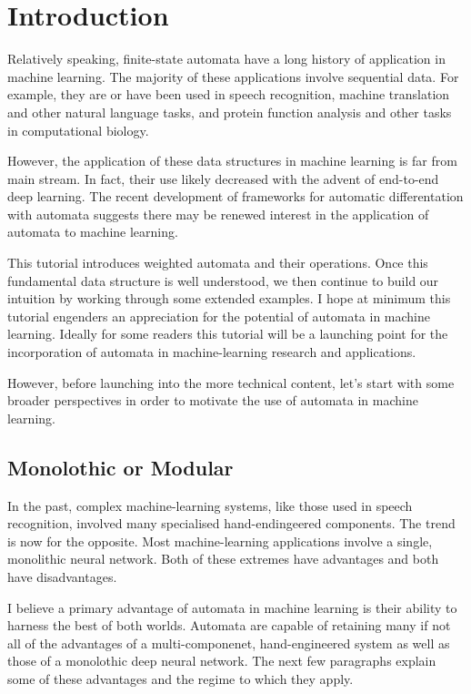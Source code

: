\documentclass[main.tex]{subfiles}
\begin{document}
\section{Introduction}
\label{sec:introduction}

Relatively speaking, finite-state automata have a long history of application
in machine learning. The majority of these applications involve sequential
data.  For example, they are or have been used in speech recognition, machine
translation and other natural language tasks, and protein function analysis and
other tasks in computational biology.

However, the application of these data structures in machine learning is far
from main stream. In fact, their use likely decreased with the advent of
end-to-end deep learning. The recent development of frameworks for automatic
differentation with automata suggests there may be renewed interest in the
application of automata to machine learning.

This tutorial introduces weighted automata and their operations. Once this
fundamental data structure is well understood, we then continue to build our
intuition by working through some extended examples.  I hope at minimum this
tutorial engenders an appreciation for the potential of automata in machine
learning. Ideally for some readers this tutorial will be a launching point for
the incorporation of automata in machine-learning research and applications.

However, before launching into the more technical content, let's start with
some broader perspectives in order to motivate the use of automata in machine
learning.

\subsection{Monolothic or Modular}

In the past, complex machine-learning systems, like those used in speech
recognition, involved many specialised hand-endingeered components. The trend
is now for the opposite. Most machine-learning applications involve a single,
monolithic neural network. Both of these extremes have advantages and both have
disadvantages.

I believe a primary advantage of automata in machine learning is their
ability to harness the best of both worlds. Automata are capable of retaining
many if not all of the advantages of a multi-componenet, hand-engineered system
as well as those of a monolothic deep neural network. The next few paragraphs
explain some of these advantages and the regime to which they apply.
\end{document}
